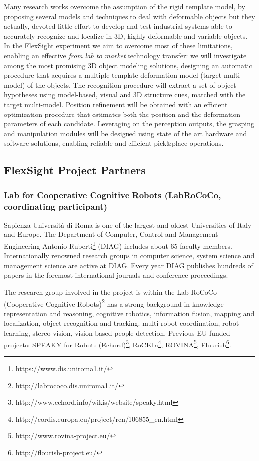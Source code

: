 Many research works overcome the assumption of the rigid template model, by proposing several models and techniques to deal with deformable objects but they actually, devoted little effort to develop and test industrial systems able to accurately recognize and localize in 3D, highly deformable and variable objects. In the FlexSight experiment we aim to overcome most of these limitations, enabling an effective \emph{from lab to market} technology transfer: we will investigate among the most promising 3D object modeling solutions, designing an automatic procedure that acquires a multiple-template deformation model (target multi-model) of the objects. The recognition procedure will extract a set of object hypotheses using model-based, visual and 3D structure cues, matched with the target multi-model. Position refinement will be obtained with an efficient optimization procedure that estimates both the position and the deformation parameters of each candidate. Leveraging on the perception outputs, the grasping and manipulation modules will be designed using state of the art hardware and software solutions, enabling reliable and efficient pick\&place operations.

\subsection{FlexSight Project Partners}\label{subsec:flexsight_partners}

\subsubsection{Lab for Cooperative Cognitive Robots (LabRoCoCo, ​coordinating participant​)}
Sapienza Università di Roma is one of the largest and oldest Universities of Italy and Europe.  The Department of Computer, Control and Management Engineering Antonio Ruberti\footnote{https://www.dis.uniroma1.it/} (DIAG) includes about 65 faculty members. Internationally renowned research groups in computer science, system science and management science are active at DIAG. Every year DIAG publishes hundreds of papers in the foremost international journals and conference proceedings.

The research group involved in the project is within the Lab RoCoCo (Cooperative Cognitive Robots)\footnote{http://labrococo.dis.uniroma1.it/} has a strong background in knowledge representation and reasoning, cognitive robotics, information fusion, mapping and localization, object recognition and tracking. multi-robot coordination, robot learning, stereo-vision, vision-based people detection. 
Previous EU-funded projects: SPEAKY for Robots (Echord)\footnote{http://www.echord.info/wikis/website/speaky.html}, RoCKIn\footnote{http://cordis.europa.eu/project/rcn/106855\_en.html}, ROVINA\footnote{http://www.rovina-project.eu/}, Flourish\footnote{http://flourish-project.eu/}.

